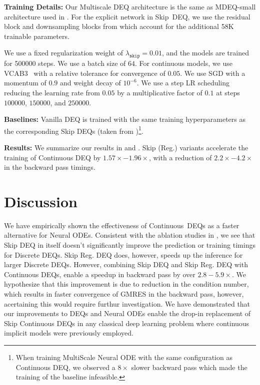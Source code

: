 \textbf{Training Details:} Our Multiscale DEQ architecture is the same as MDEQ-small architecture used in \citet{bai_multiscale_2020}. For the explicit network in Skip~DEQ, we use the residual block and downsampling blocks from \citet{bai_multiscale_2020} which account for the additional 58K trainable parameters.

We use a fixed regularization weight of $\lambda_{\texttt{skip}} = 0.01$, and the models are trained for 500000 steps. We use a batch size of $64$. For continuous models, we use VCAB3~\citep{wanner1996solving} with a relative tolerance for convergence of $0.05$. We use SGD with a momentum of $0.9$ and weight decay of $10^{-6}$. We use a step LR scheduling reducing the learning rate from $0.05$ by a multiplicative factor of $0.1$ at steps $100000$, $150000$, and $250000$.

\textbf{Baselines:} Vanilla DEQ is trained with the same training hyperparameters as the corresponding Skip DEQs (taken from \citep{bai_multiscale_2020})\footnote{When training MultiScale Neural ODE with the same configuration as Continuous DEQ, we observed a $\mathit{8\times}$ slower backward pass which made the training of the baseline infeasible.}.

\textbf{Results:} We summarize our results in  and . Skip (Reg.) variants accelerate the training of Continuous DEQ by $\mathit{1.57\times - 1.96\times}$, with a reduction of $\mathit{2.2\times - 4.2\times}$ in the backward pass timings.


\section{Discussion}
\label{sec:infinite_time_neural_odes_conclusion}

We have empirically shown the effectiveness of Continuous~DEQs as a faster alternative for Neural ODEs. Consistent with the ablation studies in \citet{bai2021neural}, we see that Skip DEQ in itself doesn't significantly improve the prediction or training timings for Discrete DEQs. Skip Reg. DEQ does, however, speeds up the inference for larger Discrete DEQs. However, combining Skip DEQ and Skip Reg. DEQ with Continuous DEQs, enable a speedup in backward pass by over $\mathit{2.8} - \mathit{5.9 \times}$. We hypothesize that this improvement is due to reduction in the condition number, which results in faster convergence of GMRES in the backward pass, however, acertaining this would require furthur investigation. We have demonstrated that our improvements to DEQs and Neural ODEs enable the drop-in replacement of Skip Continuous DEQs in any classical deep learning problem where continuous implicit models were previously employed.

